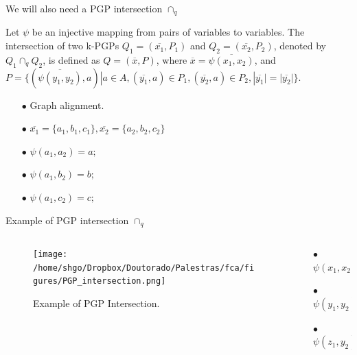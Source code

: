 \documentclass[pdf,xcolor=table]{beamer}
\begin{document}
\begin{frame}[t]{We will also need a PGP intersection $\cap_q$}
    \begin{definition}
    Let $\psi$ be an injective mapping from pairs of variables to variables.
    The intersection of two k-PGPs $Q_1 = (\overline{x_1}, P_1)$ and $Q_2 = (\overline{x_2}, P_2)$, denoted by $Q_1 \cap_q Q_2$, is defined as $Q = (\overline{x}, P)$, where $\overline{x} = \overline{\psi(x_1, x_2)}$, and $P = \{(\overline{\psi(y_1, y_2)}, a) | a \in A, (\overline{y_1}, a) \in P_1, (\overline{y_2}, a) \in P_2, |\overline{y_1}| = |\overline{y_2}|\}$.
    \end{definition}
    \begin{itemize}
        \item[$\bullet$] Graph alignment.
        \item[$\bullet$] $\overline{x_1} = \{a_1, b_1, c_1\}, \overline{x_2} = \{a_2, b_2, c_2\}$
        \item[$\bullet$] $\psi(a_1, a_2) = a;$
        \item[$\bullet$] $\psi(a_1, b_2) = b;$
        \item[$\bullet$] $\psi(a_1, c_2) = c;$
    \end{itemize}
\end{frame}

\begin{frame}[t]{Example of PGP intersection $\cap_q$}
    \begin{columns}
        \begin{column}{0.5\textwidth}
            \begin{figure}[h]
                \texttt{[image: /home/shgo/Dropbox/Doutorado/Palestras/fca/figures/PGP\_intersection.png]}
                \caption{Example of PGP Intersection.}
            \end{figure}
        \end{column}
        \begin{column}{0.5\textwidth}
            \begin{itemize}
                \item[$\bullet$] $\psi(x_1, x_2) = x$
                \item[$\bullet$] $\psi(y_1, y_2) = y$
                \item[$\bullet$] $\psi(z_1, y_2) = z$
            \end{itemize}
        \end{column}
    \end{columns}
\end{frame}
\end{document}
